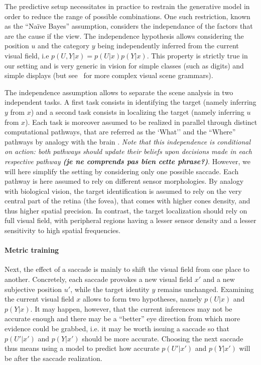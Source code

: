 The predictive setup necessitates in practice to restrain the generative model in order to reduce the range of possible combinations. One such restriction, known as the ``Naïve Bayes'' assumption, considers the independance of the factors that are the cause if the view.
The independence hypothesis allows considering the position $u$ and the category $y$ being independently inferred from the current visual field, i.e $p(U,Y|x) = p(U|x) p(Y|x)$. This property is strictly true in our setting and is very generic in vision for simple classes (such as digits) and simple displays (but see~\citep{Vo12} for more complex visual scene grammars). 

The independence assumption allows to separate the scene analysis in two independent tasks. A first task consists in identifying the target (namely inferring $y$ from $x$) and a second task consists in localizing the target (namely inferring $u$ from $x$). Each task is moreover assumed to be realized in parallel through distinct computational pathways, that are referred as the  
`What'' and the ``Where'' pathways by analogy with the brain\ICANN
{}. \emph{Note that %
this independence is conditional on action: both pathways should update their beliefs upon decisions made in each respective pathway {\bf (je ne comprends pas bien cette phrase?)}}\fi. However, we will here  simplify the setting by considering only one possible saccade.
\ICANN
\else
Each pathway is here assumed to rely on different sensor morphologies. By analogy with biological vision, the target identification is assumed to rely on the very central part of the retina (the fovea), that comes with higher cones density, and thus higher spatial precision. In contrast, the target localization should rely on full visual field, with peripheral regions having a lesser sensor density and a lesser sensitivity to high spatial frequencies. 

\fi
\paragraph{Metric training}
Next, the effect of a saccade is mainly to shift the visual field from one place to another. Concretely, each saccade provokes a new visual field $x'$ and a new subjective position $u'$, while the target identity $y$ remains unchanged. Examining the current visual field $x$ allows to form two hypotheses, namely $p(U|x)$ and $p(Y|x)$. It may happen, however, that the current inferences may not be accurate enough and there may be a ``better'' eye direction from which more evidence could be grabbed, i.e. it may be worth issuing a saccade so that $p(U'|x')$ and $p(Y|x')$ should be more accurate. Choosing the next saccade thus means using a model to predict how accurate $p(U'|x')$ and $p(Y|x')$ will be after the saccade realization. 

